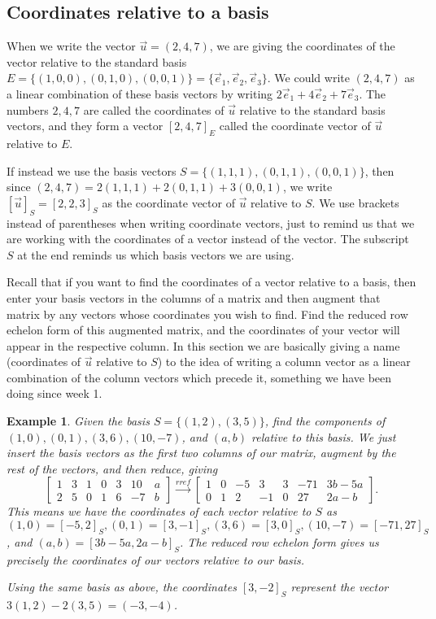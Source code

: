 \documentclass[10pt]{article}
\theoremstyle{plain}
\theoremstyle{box}
\newtheorem{example}{Example}
\begin{document}
\subsection{Coordinates relative to a basis}
When we write the vector $\vec u=(2,4,7)$, we are giving the coordinates of the vector relative to the standard basis $E=\{(1,0,0),(0,1,0),(0,0,1)\}=\{\vec e_1,\vec e_2,\vec e_3\}$. We could write $(2,4,7)$ as a linear combination of these basis vectors by writing $2\vec e_1+4\vec e_2+7\vec e_3$. The numbers $2,4,7$ are called the coordinates of $\vec u$ relative to the standard basis vectors, and they form a vector $[2,4,7]_E$ called the coordinate vector of $\vec u$ relative to $E$.  

If instead we use the basis vectors $S=\{(1,1,1),(0,1,1),(0,0,1)\}$, then since $(2,4,7)=2(1,1,1)+2(0,1,1)+3(0,0,1)$, we write $[\vec u]_S=[2,2,3]_S$ as the coordinate vector of $\vec u$ relative to $S$. We use brackets instead of parentheses when writing coordinate vectors, just to remind us that we are working with the coordinates of a vector instead of the vector.  The subscript $S$ at the end reminds us which basis vectors we are using. 

Recall that if you want to find the coordinates of a vector relative to a basis, then enter your basis vectors in the columns of a matrix and then augment that matrix by any vectors whose coordinates you wish to find.  Find the reduced row echelon form of this augmented matrix, and the coordinates of your vector will appear in the respective column. In this section we are basically giving a name (coordinates of $\vec u$ relative to $S$) to the idea of writing a column vector as a linear combination of the column vectors which precede it, something we have been doing since week 1.

\begin{example} Given the basis $S=\{(1,2),(3,5)\}$, find the components of $(1,0),(0,1),(3,6),(10,-7)$, and $(a,b)$ relative to this basis.   We just insert the basis vectors as the first two columns of our matrix, augment by the rest of the vectors, and then reduce, giving 
$$\begin{bmatrix}
 1 & 3 & 1 & 0 & 3 & 10 & a \\
 2 & 5 & 0 & 1 & 6 & -7 & b
\end{bmatrix}
\xrightarrow{rref}
\begin{bmatrix}
 1 & 0 & -5 & 3 & 3 & -71 & 3 b-5 a \\
 0 & 1 & 2 & -1 & 0 & 27 & 2 a-b
\end{bmatrix}.$$
This means we have the coordinates of each vector relative to $S$ as $(1,0) = [-5,2]_S,(0,1)=[3,-1]_S,(3,6)=[3,0]_S,(10,-7)=[-71,27]_S$, and $(a,b)=[3b-5a,2a-b]_S$. The reduced row echelon form gives us precisely the coordinates of our vectors relative to our basis.

Using the same basis as above, the coordinates $[3,-2]_S$ represent the vector $3(1,2)-2(3,5)=(-3,-4)$.  
\end{example}
\end{document}
